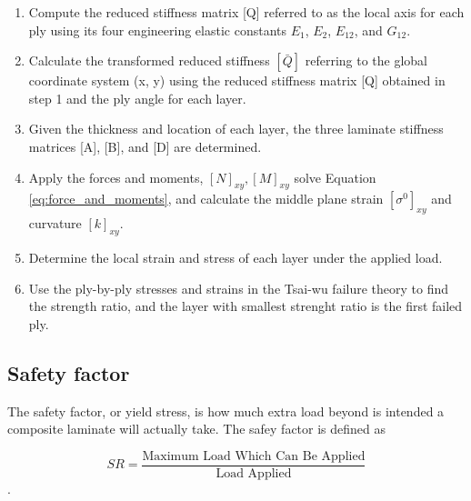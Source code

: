 \begin{enumerate}
\item Compute the reduced stiffness matrix [Q] referred to as the local axis for each ply using its
	four engineering elastic constants $E_1 $, $E_2 $, $E_{12} $, and $G_{12} $.

\item Calculate the transformed reduced stiffness $[\bar{Q}] $ referring to the global coordinate
	system (x, y) using the reduced stiffness matrix [Q] obtained in step 1 and the ply angle for
	each layer.

\item  Given the thickness and location of each layer, the three laminate stiffness matrices [A],
	[B], and [D] are determined.

\item  Apply the forces and moments, $[N]_{xy}, [M]_{xy} $ solve Equation
	\ref{eq:force_and_moments}, and calculate the middle plane strain $[\sigma ^{0}]_{xy} $ and
	curvature $[k]_{xy} $.

\item Determine the local strain and stress of each layer under the applied load.

\item  Use the ply-by-ply stresses and strains in the Tsai-wu failure theory to find the strength
	ratio, and the layer with smallest strenght ratio is the first failed ply. 
\end{enumerate}

\subsection{Safety factor}
The safety factor, or yield stress, is how much extra load beyond is intended a
composite laminate will actually take. The safey factor is defined as 

\begin{equation} \label{eq:sr}S R=\frac{\text {Maximum Load Which Can Be Applied}}{\text {Load Applied}}
\end{equation}.
